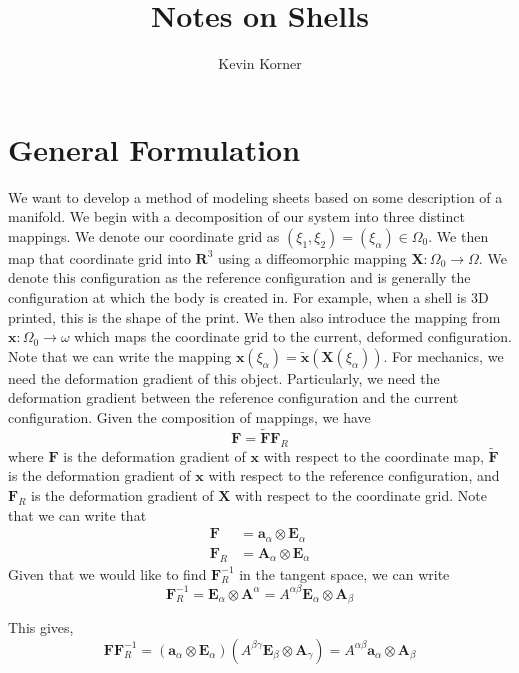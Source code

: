 \documentclass[11pt]{article}
\theoremstyle{plain}
\theoremstyle{definition}
\begin{document}
 


\title{Notes on Shells}
\author{Kevin Korner}
\maketitle


\section{General Formulation}
 We want to develop a method of modeling sheets based on some description of a manifold. We begin with a decomposition of our system into three distinct mappings. We denote our coordinate grid as $(\xi_1,\xi_2) = (\xi_\alpha) \in \Omega_0$. We then map that coordinate grid into $\mathbf{R}^3$ using a diffeomorphic mapping $\mathbf{X} : \Omega_0 \to \Omega$. We denote this configuration as the reference configuration and is generally the configuration at which the body is created in. For example, when a shell is 3D printed, this is the shape of the print. We then also introduce the mapping from $\mathbf{x} : \Omega_0 \to \omega$ which maps the coordinate grid to the current, deformed configuration. Note that we can write the mapping $\mathbf{x}(\xi_\alpha) = \tilde{\mathbf{x}}(\mathbf{X}(\xi_\alpha))$. For mechanics, we need the deformation gradient of this object. Particularly, we need the deformation gradient between the reference configuration and the current configuration. Given the composition of mappings, we have
\[
\mathbf{F} = \tilde{\mathbf{F}} \mathbf{F}_R
\]
where $\mathbf{F}$ is the deformation gradient of $\mathbf{x}$ with respect to the coordinate map, $\tilde{\mathbf{F}}$ is the deformation gradient of $\mathbf{x}$ with respect to the reference configuration, and $\mathbf{F}_R$ is the deformation gradient of $\mathbf{X}$ with respect to the coordinate grid. Note that we can write that
\[
\begin{split}
\mathbf{F} &= \mathbf{a}_\alpha \otimes \mathbf{E}_\alpha \\
\mathbf{F}_R &= \mathbf{A}_\alpha \otimes \mathbf{E}_\alpha
 \end{split}
\]
Given that we would like to find $\mathbf{F}_R^{-1}$ in the tangent space, we can write
\[
\mathbf{F}_R^{-1} = \mathbf{E}_\alpha \otimes \mathbf{A}^{\alpha} = A^{\alpha \beta} \mathbf{E}_\alpha \otimes \mathbf{A}_\beta
\]

This gives,
\[
\mathbf{F}\mathbf{F}_R^{-1} = \left(\mathbf{a}_\alpha \otimes \mathbf{E}_\alpha \right) \left(A^{\beta \gamma} \mathbf{E}_\beta \otimes \mathbf{A}_\gamma \right) = A^{\alpha \beta} \mathbf{a}_\alpha \otimes \mathbf{A}_\beta
\]
\end{document}
